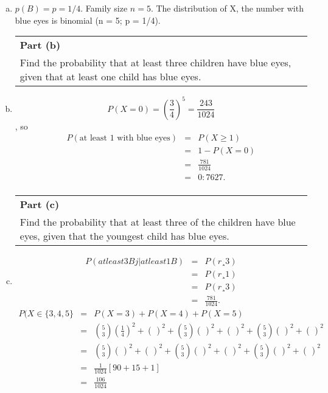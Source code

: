 \documentclass[a4paper,12pt]{article}
\begin{document}
\begin{enumerate}[(a)]
\item $p(B) = p = 1/4$. Family size $n = 5$. 
The distribution of X, the number with blue
eyes is binomial (n = 5; p = 1/4).
  \begin{table}[ht!]
     \centering
     \begin{tabular}{|p{15cm}|}
     \hline  
\noindent \textbf{Part (b)}\\ Find the probability that at least three children have blue eyes, given that at least one child has blue eyes. \\ \hline 
      \end{tabular}
    \end{table}
\item \[P(X=0) = \left(\frac{3}{4}\right)^5 = \frac{243}{1024} \], so 
\begin{eqnarray*}
P(\mbox{at least 1 with blue eyes}) 
&=& P(X\geq 1) \\
&=& 1 - P(X=0)\\ 
&=& \frac{781}{1024}\\
&=& 0:7627.\\
\end{eqnarray*}
  \begin{table}[ht!]
     \centering
     \begin{tabular}{|p{15cm}|}
     \hline  
\noindent \textbf{Part (c)}\\Find the probability that at least three of the children have blue eyes, given that the youngest child has blue eyes.
\\ \hline
      \end{tabular}
    \end{table}
\item  
\begin{eqnarray*}
P(at least 3 B j | at least 1 B)&=&P(r ¸ 3)\\
&=&P(r ¸ 1)\\ 
&=& P(r¸3)\\
&=& \frac{781}{1024}.
\end{eqnarray*}
\begin{eqnarray*}
P(X \in \{3,4,5\} &=&  P(X=3) + P(X=4) + P(X=5)\\
&=& {5 \choose 3} \left(\frac{1}{4}\right)^2 + \left(\frac{}{}\right)^2 + {5 \choose 3} \left(\frac{}{}\right)^2 + \left(\frac{}{}\right)^2 + {5 \choose 3} \left(\frac{}{}\right)^2 + \left(\frac{}{}\right)^2\\
&=& {5 \choose 3} \left(\frac{}{}\right)^2 + \left(\frac{}{}\right)^2 + {5 \choose 3} \left(\frac{}{}\right)^2 + \left(\frac{}{}\right)^2 + {5 \choose 3} \left(\frac{}{}\right)^2 + \left(\frac{}{}\right)^2\\
&=& \frac{1}{1024} \left[ 90 + 15 + 1 \right] \\
&=& \frac{106}{1024}
\end{eqnarray*}


\end{enumerate}
\end{document}

